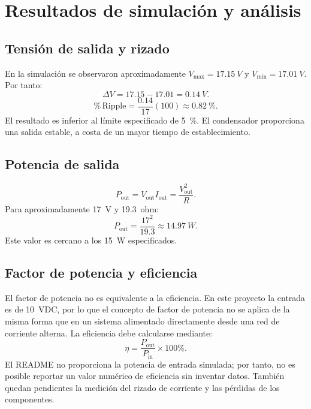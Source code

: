 \documentclass[12pt]{article}
\begin{document}
\section{Resultados de simulación y análisis}
\subsection{Tensión de salida y rizado}
En la simulación se observaron aproximadamente $V_{\max}=\SI{17.15}{V}$ y $V_{\min}=\SI{17.01}{V}$. Por tanto:
\begin{equation}
\Delta V=17.15-17.01=\SI{0.14}{V}.
\label{eq:rizado}
\end{equation}
\begin{equation}
\%\,\mathrm{Ripple}=\frac{0.14}{17}(100)\approx\SI{0.82}{\percent}.
\label{eq:porcentaje_rizado}
\end{equation}
El resultado es inferior al límite especificado de \SI{5}{\percent}. El condensador proporciona una salida estable, a costa de un mayor tiempo de establecimiento.

\subsection{Potencia de salida}
\begin{equation}
P_{\mathrm{out}}=V_{\mathrm{out}}I_{\mathrm{out}}=\frac{V_{\mathrm{out}}^2}{R}.
\label{eq:pout}
\end{equation}
Para aproximadamente \SI{17}{V} y \SI{19.3}{ohm}:
\[
P_{\mathrm{out}}=\frac{17^2}{19.3}\approx\SI{14.97}{W}.
\]
Este valor es cercano a los \SI{15}{W} especificados.

\subsection{Factor de potencia y eficiencia}
El factor de potencia no es equivalente a la eficiencia. En este proyecto la entrada es de \SI{10}{VDC}, por lo que el concepto de factor de potencia no se aplica de la misma forma que en un sistema alimentado directamente desde una red de corriente alterna. La eficiencia debe calcularse mediante:
\begin{equation}
\eta=\frac{P_{\mathrm{out}}}{P_{\mathrm{in}}}\times100\%.
\label{eq:eficiencia}
\end{equation}
El README no proporciona la potencia de entrada simulada; por tanto, no es posible reportar un valor numérico de eficiencia sin inventar datos. También quedan pendientes la medición del rizado de corriente y las pérdidas de los componentes.
\end{document}
